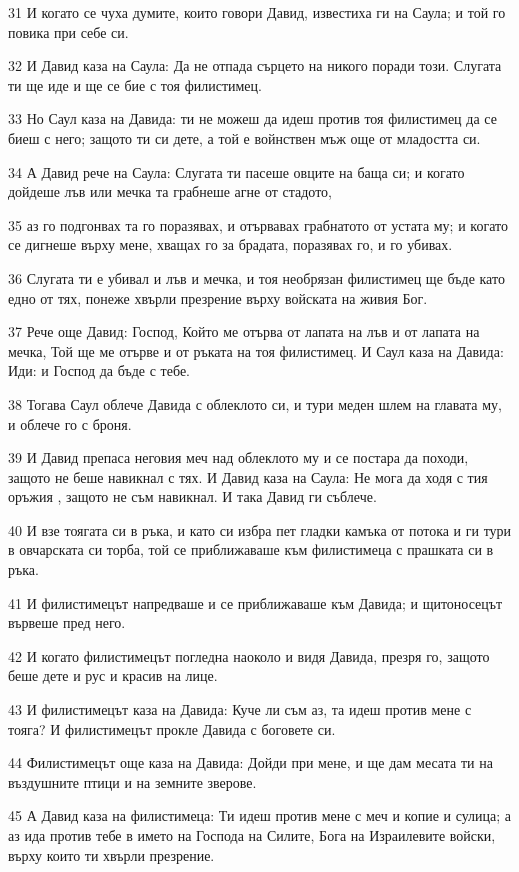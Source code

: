 \par 31 И когато се чуха думите, които говори Давид, известиха ги на Саула; и той го повика при себе си.
\par 32 И Давид каза на Саула: Да не отпада сърцето на никого поради този. Слугата ти ще иде и ще се бие с тоя филистимец.
\par 33 Но Саул каза на Давида: ти не можеш да идеш против тоя филистимец да се биеш с него; защото ти си дете, а той е войнствен мъж още от младостта си.
\par 34 А Давид рече на Саула: Слугата ти пасеше овците на баща си; и когато дойдеше лъв или мечка та грабнеше агне от стадото,
\par 35 аз го подгонвах та го поразявах, и отървавах грабнатото от устата му; и когато се дигнеше върху мене, хващах го за брадата, поразявах го, и го убивах.
\par 36 Слугата ти е убивал и лъв и мечка, и тоя необрязан филистимец ще бъде като едно от тях, понеже хвърли презрение върху войската на живия Бог.
\par 37 Рече още Давид: Господ, Който ме отърва от лапата на лъв и от лапата на мечка, Той ще ме отърве и от ръката на тоя филистимец. И Саул каза на Давида: Иди: и Господ да бъде с тебе.
\par 38 Тогава Саул облече Давида с облеклото си, и тури меден шлем на главата му, и облече го с броня.
\par 39 И Давид препаса неговия меч над облеклото му и се постара да походи, защото не беше навикнал с тях. И Давид каза на Саула: Не мога да ходя с тия оръжия , защото не съм навикнал. И така Давид ги съблече.
\par 40 И взе тоягата си в ръка, и като си избра пет гладки камъка от потока и ги тури в овчарската си торба, той се приближаваше към филистимеца с прашката си в ръка.
\par 41 И филистимецът напредваше и се приближаваше към Давида; и щитоносецът вървеше пред него.
\par 42 И когато филистимецът погледна наоколо и видя Давида, презря го, защото беше дете и рус и красив на лице.
\par 43 И филистимецът каза на Давида: Куче ли съм аз, та идеш против мене с тояга? И филистимецът прокле Давида с боговете си.
\par 44 Филистимецът още каза на Давида: Дойди при мене, и ще дам месата ти на въздушните птици и на земните зверове.
\par 45 А Давид каза на филистимеца: Ти идеш против мене с меч и копие и сулица; а аз ида против тебе в името на Господа на Силите, Бога на Израилевите войски, върху които ти хвърли презрение.
